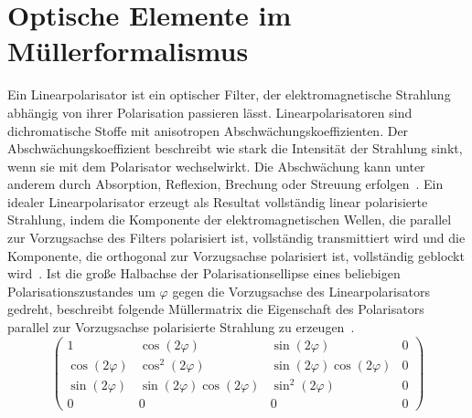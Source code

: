 \documentclass[a4paper,12pt,twoside,parskip=no,headsepline,open=right,ngerman,export]{scrreprt}
\begin{document}
        
        \section{Optische Elemente im Müllerformalismus}\label{sec:theo_optischeBauteile}
            
            Ein Linearpolarisator ist ein optischer Filter, der elektromagnetische Strahlung abhängig von ihrer Polarisation passieren lässt. Linearpolarisatoren sind dichromatische Stoffe mit anisotropen Abschwächungskoeffizienten. Der Abschwächungskoeffizient beschreibt wie stark die Intensität der Strahlung sinkt, wenn sie mit dem Polarisator wechselwirkt. Die Abschwächung kann unter anderem durch Absorption, Reflexion, Brechung oder Streuung erfolgen~\cite{gil_polarized_2016}. Ein idealer Linearpolarisator erzeugt als Resultat vollständig linear polarisierte Strahlung, indem die Komponente der elektromagnetischen Wellen, die parallel zur Vorzugsachse des Filters polarisiert ist, vollständig transmittiert wird und die Komponente, die orthogonal zur Vorzugsachse polarisiert ist, vollständig geblockt wird~\cite{gil_polarized_2016}. Ist die große Halbachse der Polarisationsellipse eines beliebigen Polarisationszustandes um $\varphi$ gegen die Vorzugsachse des Linearpolarisators gedreht, beschreibt folgende  Müllermatrix die Eigenschaft des Polarisators parallel zur Vorzugsachse polarisierte Strahlung zu erzeugen~\cite{gil_polarized_2016}.
            \begin{equation*}
                \begin{pmatrix}
                    1               & \cos(2\varphi)                & \sin(2\varphi)                & 0 \\
                    \cos(2\varphi)  & \cos^2(2\varphi)              & \sin(2\varphi)\cos(2\varphi)  & 0 \\
                    \sin(2\varphi)  & \sin(2\varphi)\cos(2\varphi)  & \sin^2(2\varphi)              & 0 \\
                    0               & 0                             & 0                             & 0
                \end{pmatrix}
            \end{equation*}
            
\end{document}

